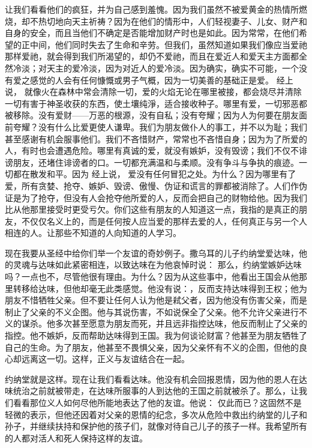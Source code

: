 让我们看看他们的疯狂，并为自己感到羞愧。因为我们虽然不被爱黄金的热情所燃烧，却不热切地向天主祈祷？因为在他们的情形中，人们轻视妻子、儿女、财产和自身的安全，而且当他们不确定是否能增加财产时也是如此。因为常常，在他们希望的正中间，他们同时失去了生命和辛劳。但我们，虽然知道如果我们像应当爱祂那样爱祂，就会得到我们所渴望的，却仍不爱祂，而且在爱近人和爱天主方面都全然冷淡；对天主的爱冷淡，因为对近人的爱冷淡。因为确实，确实不可能，一个没有爱之感觉的人会有任何慷慨或男子气概，因为一切美善的基础正是爱。 经上说， 就像火在森林中常会清除一切，爱的火焰无论在哪里被接，都会烧尽并清除一切有害于神圣收获的东西，使土壤纯淨，适合接收种子。哪里有爱，一切邪恶都被移除。没有爱财——万恶的根源，没有自私；没有夸耀；因为人为何要在朋友面前夸耀？没有什么比爱更使人谦卑。我们为朋友做仆人的事工，并不以为耻；我们甚至感谢有机会服事他们。我们不吝惜财产，常常也不吝惜自身；因为为了所爱的人，有时也会遭遇危险。哪里有真诚的爱，就没有嫉妒，没有毁谤；我们不仅不诽谤朋友，还堵住诽谤者的口。一切都充满温和与柔顺。没有争斗与争执的痕迹。一切都在散发和平。因为 经上说， 爱没有任何冒犯之处。为什么？因为哪里有了爱，所有贪婪、抢夺、嫉妒、毁谤、傲慢、伪证和谎言的罪都被消除了。人们作伪证是为了抢夺，但没有人会抢夺他所爱的人，反而会把自己的财物给他。因为我们比从他那里接受时更受亏欠。你们这些有朋友的人知道这一点，我指的是真正的朋友，不仅仅名义上的，而是任何按人应当爱的那样去爱的人，任何真正与另一个人相连的人。让那些不知道的人向知道的人学习。\par

现在我要从圣经中给你们举一个友谊的奇妙例子。撒乌耳的儿子约纳堂爱达味，他的灵魂与达味如此紧密相连，以致达味在为他哀悼时说： 那么，约纳堂嫉妒达味吗？一点也不，尽管他很有理由。为什么？因为从这些事中，他看出王国会从他那里转移给达味，但他却毫无此类感觉。他没有说：，反而支持达味得到王权；他为朋友不惜牺牲父亲。但不要让任何人认为他是弒父者，因为他没有伤害父亲，而是制止了父亲的不义企图。他与其说伤害，不如说保全了父亲。他不允许父亲进行不义的谋杀。他多次甚至愿意为朋友而死，并且远非指控达味，他反而制止了父亲的指控。他不嫉妒，反而帮助达味得到王国。我为何谈论财富？他甚至为朋友牺牲了自己的生命。为了朋友，他甚至不畏惧父亲，因为父亲怀有不义的企图，但他的良心却远离这一切。这样，正义与友谊结合在一起。\par

约纳堂就是这样。现在让我们看看达味。他没有机会回报恩情，因为他的恩人在达味统治之前就被带走，在达味所服事的人到达他的王国之前就被杀了。那么，让我们看看那位义人如何尽他所能地表达了他的友谊。他说： 仅此而已？这固然不是轻微的表示，但他还因着对父亲的恩情的纪念，多次从危险中救出约纳堂的儿子和孙子，并继续扶持和保护他的孩子们，就像对待自己儿子的孩子一样。我希望所有的人都对活人和死人保持这样的友谊。\par

